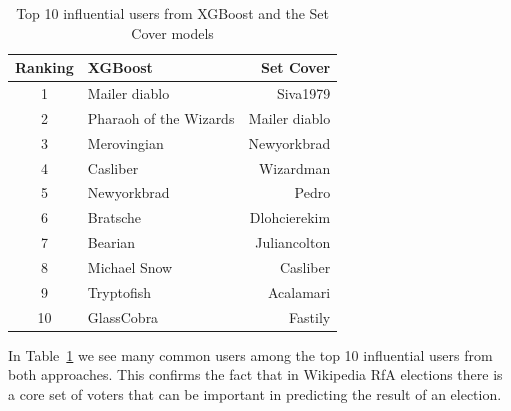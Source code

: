 \begin{table}[!ht]
    \centering
    \begin{tabular}{clr}
        \toprule
        Ranking&XGBoost&Set Cover\\
        \midrule
        1& Mailer diablo & Siva1979\\
        2&Pharaoh of the Wizards&Mailer diablo\\
        3&Merovingian&Newyorkbrad\\
        4&Casliber&Wizardman\\
        5&Newyorkbrad&Pedro\\
        6&Bratsche&Dlohcierekim\\
        7&Bearian&Juliancolton\\
        8&Michael Snow&Casliber\\
        9&Tryptofish&Acalamari\\
        10&GlassCobra&Fastily\\
        \bottomrule
    \end{tabular}
    \caption{Top 10 influential users from XGBoost and the Set Cover models}
    \label{tab:top-10}
\end{table}
In Table~\ref{tab:top-10} we see many common users among the top 10 influential users from both approaches. This confirms the fact that in Wikipedia RfA elections there is a core set of voters that can be important in predicting the result of an election.